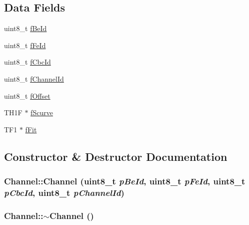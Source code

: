 \subsection*{Data Fields}
\begin{CompactItemize}
\item 
uint8\_\-t \hyperlink{struct_channel_8b456db0ac7206afd7062c7fc6ea1015}{f\-Be\-Id}
\item 
uint8\_\-t \hyperlink{struct_channel_05c28fbcfbe6afc306791e57c14ee90f}{f\-Fe\-Id}
\item 
uint8\_\-t \hyperlink{struct_channel_434b0806f9c242aa903f8be8e5849d7b}{f\-Cbc\-Id}
\item 
uint8\_\-t \hyperlink{struct_channel_6bf2beaaef75ac318efdda6c63fd14d4}{f\-Channel\-Id}
\item 
uint8\_\-t \hyperlink{struct_channel_40a902cc52cb9d00f537094d3944a121}{f\-Offset}
\item 
TH1F $\ast$ \hyperlink{struct_channel_cc4d3eaf08d6c4951f3ae678000ff684}{f\-Scurve}
\item 
TF1 $\ast$ \hyperlink{struct_channel_5ca62453f01642d2b85ab4d24acf5783}{f\-Fit}
\end{CompactItemize}


\subsection{Constructor \& Destructor Documentation}
\hypertarget{struct_channel_9020dabc51a3a2bc7ba558cc3b5c8c45}{
\subsubsection[Channel]{\setlength{\rightskip}{0pt plus 5cm}Channel::Channel (uint8\_\-t {\em p\-Be\-Id}, uint8\_\-t {\em p\-Fe\-Id}, uint8\_\-t {\em p\-Cbc\-Id}, uint8\_\-t {\em p\-Channel\-Id})}}
\label{struct_channel_9020dabc51a3a2bc7ba558cc3b5c8c45}


\hypertarget{struct_channel_5f15ebd302464069f1a9e3f0ded14482}{
\subsubsection[$\sim$Channel]{\setlength{\rightskip}{0pt plus 5cm}Channel::$\sim$Channel ()}}
\label{struct_channel_5f15ebd302464069f1a9e3f0ded14482}





